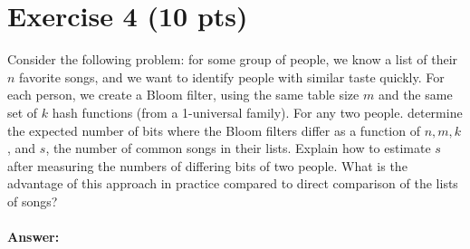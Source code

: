 \documentclass[a4paper]{article}
\begin{document}
\section{Exercise 4 (10 pts)}

\noindent Consider the following problem: for some group of people, we know a list of their $n$ favorite songs, and we want to identify people with similar taste quickly. For each person, we create a Bloom filter, using the same table size $m$ and the same set of $k$ hash functions (from a 1-universal family). For any two people. determine the expected number of bits where the Bloom filters differ as a function of $n, m, k$, and $s$, the number of common songs in their lists. Explain how to estimate $s$ after measuring the numbers of differing bits of two people. What is the advantage of this approach in practice compared to direct comparison of the lists of songs?

\paragraph{Answer:}
\end{document}
